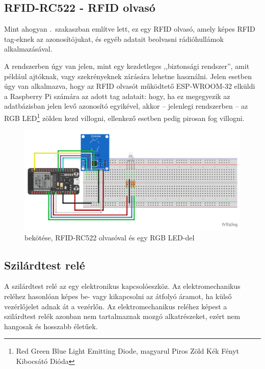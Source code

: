 \documentclass[
]{thesis-ekf}
\theoremstyle{definition}
\theoremstyle{remark}
\begin{document}
	\subsection{RFID-RC522 - RFID olvasó}\label{rfid-esp-section}
	Mint ahogyan .~szakaszban említve lett, ez egy RFID olvasó, amely képes RFID tag-eknek az azonosítójukat, és egyéb adatait beolvasni rádióhullámok alkalmazásával.
	
	A rendszerben úgy van jelen, mint egy kezdetleges ,,biztonsági rendszer'', amit például ajtóknak, vagy szekrényeknek zárására lehetne használni. Jelen esetben úgy van alkalmazva, hogy az RFID olvasót működtető ESP-WROOM-32 elküldi a Raspberry Pi számára az adott tag adatait: hogy, ha ez megegyezik az adatbázisban jelen levő azonosító egyikével, akkor -- jelenlegi rendszerben -- az RGB LED\footnote{\label{rgb-led}Red Green Blue Light Emitting Diode, magyarul Piros Zöld Kék Fényt Kibocsátó Dióda} zölden kezd villogni, ellenkező esetben pedig pirosan fog villogni.
	
	\begin{figure}[ht!]
		\centering
		\includegraphics[width=1\textwidth]{./src/schematics/RFID reader schematics_bb}
		\caption{ bekötése, RFID-RC522 olvasóval és egy RGB LED-del}
		\label{rfid-schematics}
	\end{figure}	
	
	\subsection{Szilárdtest relé}
	
	A szilárdtest relé az egy elektronikus kapcsolóeszköz. Az elektromechanikus reléhez hasonlóan képes be- vagy kikapcsolni az átfolyó áramot, ha külső vezérlőjelet adnak át a vezérlőn. Az elektromechanikus reléhez képest a szilárdtest relék azonban nem tartalmaznak mozgó alkatrészeket, ezért nem hangosak és hosszabb életűek. 
	
\end{document}
